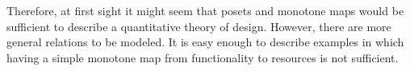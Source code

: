 \begin{comment}
\begin{figure}[h!]
    \centering
    \begin{tikzcd}
        \bullet &\arrow[l] \bullet\\[-15pt]
        \text{mass} & \text{capacity}
    \end{tikzcd}
    \caption{Example of the design of a battery. }
    \label{fig:battery-example}
\end{figure}
\end{comment}

Therefore, at first sight it might seem that posets and monotone maps would be sufficient to describe a quantitative theory of design.
However, there are more general relations to be modeled.
It is easy enough to describe examples in which having a simple monotone map from functionality to resources is not sufficient.

